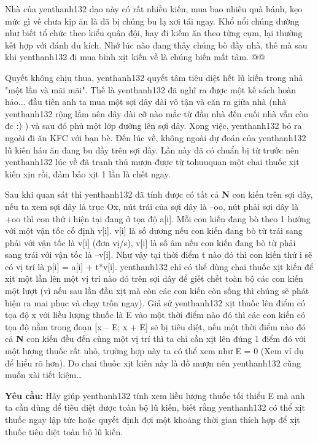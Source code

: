 Nhà của yenthanh132 dạo này có rất nhiều kiến, mua bao nhiêu quà bánh, kẹo mức gì về chưa kịp ăn là đã bị chúng bu lạ xơi tái ngay. Khổ nổi chúng dường như biết tổ chức theo kiểu quân đội, hay đi kiếm ăn theo từng cụm, lại thường kết hợp với đánh du kích. Nhớ lúc nào đang thấy chúng bò đầy nhà, thế mà sau khi yenthanh132 đi mua bình xịt kiến về là chúng biến mất tâm. @@

Quyết không chịu thua, yenthanh132 quyết tâm tiêu diệt hết lũ kiến trong nhà "một lần và mãi mãi". Thế là yenthanh132 đã nghĩ ra được một kế sách hoàn hảo... đầu tiên anh ta mua một sợi dây dài vô tận và căn ra giữa nhà (nhà yenthanh132 rộng lắm nên dây dài cỡ nào mắc từ đầu nhà đến cuối nhà vẫn còn đc :) ) và sau đó phủ một lớp đường lên sợi dây. Xong việc, yenthanh132 bỏ ra ngoài đi ăn KFC với bạn bè. Đến lúc về, không ngoài dự đoán của yenthanh132 lũ kiến háu ăn đang bu đầy trên sợi dây. Lần này đã có chuẩn bị từ trước nên yenthanh132 lúc về đã tranh thủ mượn được từ tohuuquan một chai thuốc xịt kiến xịn rồi, đảm bảo xịt 1 lần là chết ngay.

Sau khi quan sát thì yenthanh132 đã tính được có tất cả \textbf{ N } con kiến trên sợi dây, nếu ta xem sợi dây là trục Ox, nút trái của sợi dây là –oo, nút phải sợi dây là +oo thì con thứ i hiện tại đang ở tọa độ a[i]. Mỗi con kiến đang bò theo 1 hướng với một vận tốc cố định v[i]. v[i] là số dương nếu con kiến đang bò từ trái sang phải với vận tốc là v[i] (đơn vị/s), v[i] là số âm nếu con kiến đang bò từ phải sang trái với vận tốc là –v[i]. Như vậy tại thời điểm t nào đó thì con kiến thứ i sẽ có vị trí là p[i] = a[i] + t*v[i]. yenthanh132 chỉ có thể dùng chai thuốc xịt kiến để xịt một lần lên một vị trí nào đó trên sợi dây để giết chết toàn bộ các con kiến một lượt (vì nếu sau lần đầu xịt mà còn các con kiến còn sống thì chúng sẽ phát hiện ra mai phục và chạy trốn ngay). Giả sử yenthanh132 xịt thuốc lên điểm có tọa độ x với liều lượng thuốc là E vào một thời điểm nào đó thì các con kiến có tọa độ nằm trong đoạn [x – E; x + E] sẽ bị tiêu diệt, nếu một thời điểm nào đó cả \textbf{ N } con kiến đều đến cùng một vị trí thì ta chỉ cần xịt lên đúng 1 điểm đó với một lượng thuốc rất nhỏ, trường hợp này ta có thể xem như E = 0 (Xem ví dụ để hiểu rõ hơn). Do chai thuốc xịt kiến này là đồ mượn nên yenthanh132 cũng muốn xài tiết kiệm…

\textbf{Yêu cầu: } Hãy giúp yenthanh132 tính xem liều lượng thuốc tối thiểu E mà anh ta cần dùng để tiêu diệt được toàn bộ lũ kiến, biết rằng yenthanh132 có thể xịt thuốc ngay lập tức hoặc quyết định đợi một khoảng thời gian thích hợp để xịt thuốc tiêu diệt toàn bộ lũ kiến.